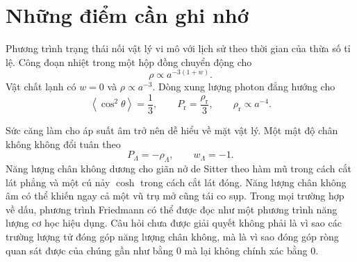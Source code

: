 \section{Những điểm cần ghi nhớ}

Phương trình trạng thái nối vật lý vi mô với lịch sử theo thời gian của thừa số tỉ lệ. Công đoạn nhiệt trong một hộp đồng chuyển động cho
\[
\rho\propto a^{-3(1+w)}.
\]
Vật chất lạnh có \(w=0\) và \(\rho\propto a^{-3}\). Dòng xung lượng photon đẳng hướng cho
\[
\left\langle\cos^2\theta\right\rangle=\frac13,
\qquad
P_{\mathrm r}=\frac{\rho_{\mathrm r}}{3},
\qquad
\rho_{\mathrm r}\propto a^{-4}.
\]

Sức căng làm cho áp suất âm trở nên dễ hiểu về mặt vật lý. Một mật độ chân không không đổi tuân theo
\[
P_\Lambda=-\rho_\Lambda,
\qquad
w_\Lambda=-1.
\]
Năng lượng chân không dương cho giãn nở de Sitter theo hàm mũ trong cách cắt lát phẳng và một cú nảy \(\cosh\) trong cách cắt lát đóng. Năng lượng chân không âm có thể khiến ngay cả một vũ trụ mở cũng tái co sụp. Trong mọi trường hợp về dấu, phương trình Friedmann có thể được đọc như một phương trình năng lượng cơ học hiệu dụng. Câu hỏi chưa được giải quyết không phải là vì sao các trường lượng tử đóng góp năng lượng chân không, mà là vì sao đóng góp ròng quan sát được của chúng gần như bằng 0 mà lại không chính xác bằng 0.
